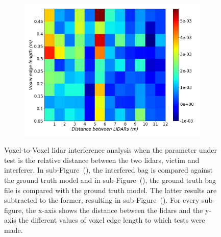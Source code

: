 \begin{figure}[!ht]
\begin{subfigure}[c]{0.45\textwidth}
	\label{fig:distance:octree-ground-truth-color-mesh}
\end{subfigure}
\\ \vspace{4mm}
\begin{subfigure}[c]{0.6\textwidth}
	\includegraphics[width=\textwidth]{img/lidar-interference/distance/octree_difference_color_mesh.png}
	\caption{}%
	\label{fig:distance:octree-difference-color-mesh}
\end{subfigure}

\caption[Voxel-to-Voxel analysis when the distance between the \acp{lidar} is variated.]{Voxel-to-Voxel \ac{lidar} interference analysis when the parameter under test is the relative distance between the two \acp{lidar}, victim and interferer. In sub-Figure~(), the interfered bag is compared against the ground truth model and in sub-Figure~(), the ground truth bag file is compared with the ground truth model. The latter results are subtracted to the former, resulting in sub-Figure~(). For every sub-figure, the x-axis shows the distance between the \acp{lidar} and the y-axis the different values of voxel edge length to which tests were made.}
\label{fig:distance:octree-color-mesh}
\end{figure}

